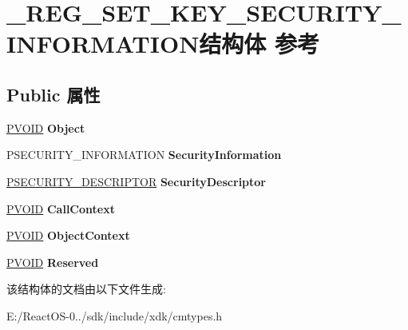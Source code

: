\hypertarget{struct___r_e_g___s_e_t___k_e_y___s_e_c_u_r_i_t_y___i_n_f_o_r_m_a_t_i_o_n}{}\section{\+\_\+\+R\+E\+G\+\_\+\+S\+E\+T\+\_\+\+K\+E\+Y\+\_\+\+S\+E\+C\+U\+R\+I\+T\+Y\+\_\+\+I\+N\+F\+O\+R\+M\+A\+T\+I\+O\+N结构体 参考}
\label{struct___r_e_g___s_e_t___k_e_y___s_e_c_u_r_i_t_y___i_n_f_o_r_m_a_t_i_o_n}
\subsection*{Public 属性}
\begin{DoxyCompactItemize}
\item 
\mbox{\label{struct___r_e_g___s_e_t___k_e_y___s_e_c_u_r_i_t_y___i_n_f_o_r_m_a_t_i_o_n_ad963c0dd276a0f502b01be4ca6308c7b}} 
\hyperlink{interfacevoid}{P\+V\+O\+ID} {\bfseries Object}
\item 
\mbox{\label{struct___r_e_g___s_e_t___k_e_y___s_e_c_u_r_i_t_y___i_n_f_o_r_m_a_t_i_o_n_aaeeb83249a995370bb7701edd5088cfe}} 
P\+S\+E\+C\+U\+R\+I\+T\+Y\+\_\+\+I\+N\+F\+O\+R\+M\+A\+T\+I\+ON {\bfseries Security\+Information}
\item 
\mbox{\label{struct___r_e_g___s_e_t___k_e_y___s_e_c_u_r_i_t_y___i_n_f_o_r_m_a_t_i_o_n_a7a036e240ca9af60a01c275ac730fa67}} 
\hyperlink{struct___s_e_c_u_r_i_t_y___d_e_s_c_r_i_p_t_o_r}{P\+S\+E\+C\+U\+R\+I\+T\+Y\+\_\+\+D\+E\+S\+C\+R\+I\+P\+T\+OR} {\bfseries Security\+Descriptor}
\item 
\mbox{\label{struct___r_e_g___s_e_t___k_e_y___s_e_c_u_r_i_t_y___i_n_f_o_r_m_a_t_i_o_n_ad940066f15b39f6f0cc4be1da60a82db}} 
\hyperlink{interfacevoid}{P\+V\+O\+ID} {\bfseries Call\+Context}
\item 
\mbox{\label{struct___r_e_g___s_e_t___k_e_y___s_e_c_u_r_i_t_y___i_n_f_o_r_m_a_t_i_o_n_a1ee03b4168a3a82b229a3cb7411a32b4}} 
\hyperlink{interfacevoid}{P\+V\+O\+ID} {\bfseries Object\+Context}
\item 
\mbox{\label{struct___r_e_g___s_e_t___k_e_y___s_e_c_u_r_i_t_y___i_n_f_o_r_m_a_t_i_o_n_a8cb00316e73b6b56d6137b24f8c6d2b5}} 
\hyperlink{interfacevoid}{P\+V\+O\+ID} {\bfseries Reserved}
\end{DoxyCompactItemize}


该结构体的文档由以下文件生成\+:\begin{DoxyCompactItemize}
\item 
E\+:/\+React\+O\+S-\/0../sdk/include/xdk/cmtypes.\+h\end{DoxyCompactItemize}
